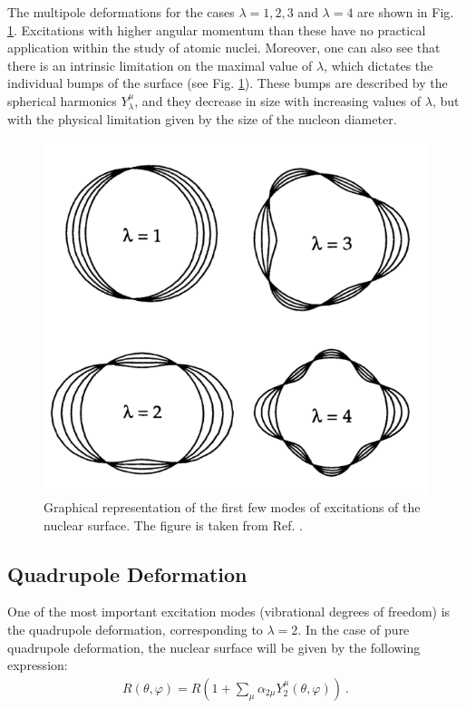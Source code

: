 The multipole deformations for the cases $\lambda=1,2,3$ and $\lambda=4$ are shown in Fig. \ref{multipole-deformations}. Excitations with higher angular momentum than these have no practical application within the study of atomic nuclei. Moreover, one can also see that there is an intrinsic limitation on the maximal value of $\lambda$, which dictates the individual bumps of the surface (see Fig. \ref{multipole-deformations}). These bumps are described by the spherical harmonics $Y_\lambda^\mu$, and they decrease in size with increasing values of $\lambda$, but with the physical limitation given by the size of the nucleon diameter.
\begin{figure}
    \centering
    \includegraphics[scale=0.3]{Chapters/Figures/nuclearDeformation.png}
    \caption{Graphical representation of the first few modes of excitations of the nuclear surface. The figure is taken from Ref. \cite{greiner1996nuclear}.}
    \label{multipole-deformations}
\end{figure}

\subsection{Quadrupole Deformation}

One of the most important excitation modes (vibrational degrees of freedom) is the quadrupole deformation, corresponding to $\lambda=2$. In the case of pure quadrupole deformation, the nuclear surface will be given by the following expression:
\begin{align}
    R(\theta,\varphi)=R\left(1+\sum_\mu\alpha_{2\mu}Y_2^\mu(\theta,\varphi)\right)\ . \label{quadrupole-surface}
\end{align}

